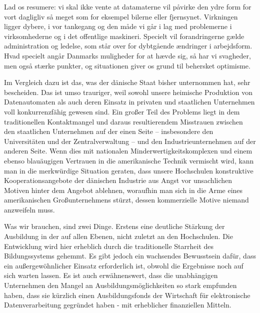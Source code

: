 {Lad os resumere: vi skal ikke vente at datamaterne vil påvirke den ydre form for vort dagligliv så meget som for eksempel bilerne eller fjernsynet. Virkningen ligger dybere, i vor tankegang og den måde vi går i lag med problemerne i virksomhederne og i det offentlige maskineri. Specielt vil forandringerne gælde administration og ledelse, som står over for dybtgående ændringer i arbejdsform. Hvad specielt angår Danmarks muligheder for at hævde sig, så har vi svagheder, men også stærke punkter, og situationen giver os grund til behersket optimisme.
}{
Im Vergleich dazu ist das, was der dänische Staat bisher unternommen hat, sehr bescheiden. Das ist umso trauriger, weil sowohl unsere heimische Produktion von Datenautomaten als auch deren Einsatz in privaten und staatlichen Unternehmen voll konkurrenzfähig gewesen sind. Ein großer Teil des Problems liegt in dem traditionellen Kontaktmangel und daraus resultierendem Misstrauen zwischen den staatlichen Unternehmen auf der einen Seite -- insbesondere den Universitäten und der Zentralverwaltung -- und den Industrieunternehmen auf der anderen Seite. Wenn dies mit nationalen Minderwertigkeitskomplexen und einem ebenso blauäugigen Vertrauen in die amerikanische Technik vermischt wird, kann man in die merkwürdige Situation geraten, dass unsere Hochschulen konstruktive Kooperationsangebote der dänischen Industrie aus Angst vor unsachlichen Motiven hinter dem Angebot ablehnen, woraufhin man sich in die Arme eines amerikanischen Großunternehmens stürzt, dessen kommerzielle Motive niemand anzweifeln muss.

Was wir brauchen, sind zwei Dinge. Erstens eine deutliche Stärkung der Ausbildung in der  auf allen Ebenen, nicht zuletzt an den Hochschulen. Die Entwicklung wird hier erheblich durch die traditionelle Starrheit des Bildungssystems gehemmt. Es gibt jedoch ein wachsendes Bewusstsein dafür, dass ein außergewöhnlicher Einsatz erforderlich ist, obwohl die Ergebnisse noch auf sich warten lassen. Es ist auch erwähnenswert, dass die unabhängigen Unternehmen den Mangel an Ausbildungsmöglichkeiten so stark empfunden haben, dass sie kürzlich einen Ausbildungsfonds der Wirtschaft für elektronische Datenverarbeitung gegründet haben - mit erheblicher finanziellen Mitteln.

}
